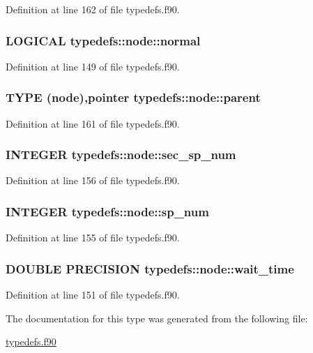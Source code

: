 Definition at line 162 of file typedefs.f90.\hypertarget{typetypedefs_1_1node_af5be5276f596dfc7b0bc8708399cceab}{
\subsubsection[{normal}]{\setlength{\rightskip}{0pt plus 5cm}LOGICAL {\bf typedefs::node::normal}}}
\label{typetypedefs_1_1node_af5be5276f596dfc7b0bc8708399cceab}


Definition at line 149 of file typedefs.f90.\hypertarget{typetypedefs_1_1node_aaf2b0960c972482e99ec436164e05601}{
\subsubsection[{parent}]{\setlength{\rightskip}{0pt plus 5cm}TYPE ({\bf node}),pointer {\bf typedefs::node::parent}}}
\label{typetypedefs_1_1node_aaf2b0960c972482e99ec436164e05601}


Definition at line 161 of file typedefs.f90.\hypertarget{typetypedefs_1_1node_a0ca13f8084895c39c097825fb4675e07}{
\subsubsection[{sec\_\-sp\_\-num}]{\setlength{\rightskip}{0pt plus 5cm}INTEGER {\bf typedefs::node::sec\_\-sp\_\-num}}}
\label{typetypedefs_1_1node_a0ca13f8084895c39c097825fb4675e07}


Definition at line 156 of file typedefs.f90.\hypertarget{typetypedefs_1_1node_ac16e5faa3b1912530557fe907e0391a6}{
\subsubsection[{sp\_\-num}]{\setlength{\rightskip}{0pt plus 5cm}INTEGER {\bf typedefs::node::sp\_\-num}}}
\label{typetypedefs_1_1node_ac16e5faa3b1912530557fe907e0391a6}


Definition at line 155 of file typedefs.f90.\hypertarget{typetypedefs_1_1node_a871e2d663d593966f53b92afe0cf7a9d}{
\subsubsection[{wait\_\-time}]{\setlength{\rightskip}{0pt plus 5cm}DOUBLE PRECISION {\bf typedefs::node::wait\_\-time}}}
\label{typetypedefs_1_1node_a871e2d663d593966f53b92afe0cf7a9d}


Definition at line 151 of file typedefs.f90.

The documentation for this type was generated from the following file:\begin{DoxyCompactItemize}
\item 
\hyperlink{typedefs_8f90}{typedefs.f90}\end{DoxyCompactItemize}
